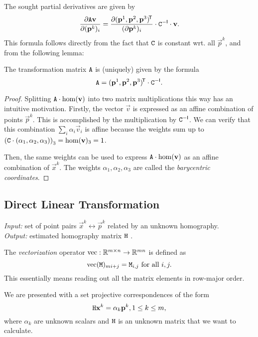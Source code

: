 The sought partial derivatives are given by
\begin{equation} \label{e:algo-aff}
\frac {\partial \mathtt{A} \mathbf{v}} {\partial (\mathbf{p}^k)_i} = \frac {\partial (\mathbf{p}^1, \mathbf{p}^2, \mathbf{p}^3)^{\!\mathsf{T}}} {(\partial \mathbf{p}^k)_i} \cdot \mathtt{C} ^{-\mathsf{I}} \cdot \mathbf{v}.
\end{equation}
This formula follows directly from the fact that $\mathtt{C}$ is constant wrt. all $\vec p^k$, and from the following lemma:

\begin{lemma} \label{l:algo-aff}
The transformation matrix $\mathtt{A}$ is (uniquely) given by the formula
$$\mathtt{A} = (\mathbf{p}^1, \mathbf{p}^2, \mathbf{p}^3)^{\!\mathsf{T}} \cdot \mathtt{C} ^{-\mathsf{I}}.$$
\end{lemma}

\begin{proof}
Splitting $\mathtt{A} \cdot \mathrm{hom}(\mathbf{v})$ into two matrix multiplications this way has an intuitive motivation.
Firstly, the vector $\vec v$ is expressed as an affine combination of points $\vec p^k$.
This is accomplished by the multiplication by $\mathtt{C} ^{-\mathsf{I}}$.
We can verify that this combination $\sum_i \alpha_i \vec v_i$ is affine because the weights sum up to $\left(\mathtt{C} \cdot (\alpha_1, \alpha_2, \alpha_3) \right)_3 = \mathrm{hom}(\mathbf{v})_3 = 1$.

Then, the same weights can be used to express $\mathtt{A} \cdot \mathrm{hom}(\mathbf{v})$ as an affine combination of $\vec x^k$.
The weights $\alpha_1, \alpha_2, \alpha_3$ are called the \textit{barycentric coordinates}.
\end{proof}

\subsection{Direct Linear Transformation}

\textit{Input:} set of point pairs $\vec x^k \leftrightarrow \vec p^k$ related by an unknown homography.\\
\textit{Output:} estimated homography matrix $\mathtt{H}$ .\\

\begin{definition}
The \textit{vectorization} operator $\mathrm{vec} : \mathbb{R}^{m \times n} \to \mathbb{R}^{mn}$ is defined as
$$\mathrm{vec}(\mathtt{M})_{m i + j} = \mathtt{M}_{i,j} \textrm{ for all } i, j.$$
This essentially means reading out all the matrix elements in row-major order.
\end{definition}

We are presented with a set projective correspondences of the form
\begin{equation} \label{e:homography-input}
\mathtt{H} \mathbf{x}^k = \alpha_k \mathbf{p}^k, 1 \leq k \leq m,
\end{equation}
where $\alpha_k$ are unknown scalars and $\mathtt{H}$ is an unknown matrix that we want to calculate.

